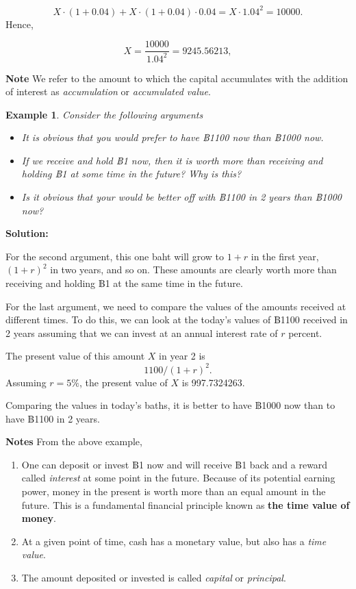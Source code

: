 \documentclass[
]{book}
\theoremstyle{definition}
\theoremstyle{definition}
\newtheorem{example}{Example}[chapter]
\theoremstyle{definition}
\theoremstyle{definition}
\theoremstyle{remark}
\begin{document}
\[X\cdot (1 + 0.04) + X \cdot (1 + 0.04) \cdot 0.04 =   X  \cdot  1.04^2 = 10000.\]
Hence,

\[X = \frac{10000}{1.04^2} = 9245.56213,\]

\textbf{Note} We refer to the amount to which the capital accumulates with
the addition of interest as \emph{accumulation} or \emph{accumulated value}.

\begin{example}

\emph{Consider the following arguments}

\begin{itemize}
\item
  \emph{It is obvious that you would prefer to have ฿1100 now than ฿1000
  now.}
\item
  \emph{If we receive and hold ฿1 now, then it is worth more than receiving
  and holding ฿1 at some time in the future? Why is this?}
\item
  \emph{Is it obvious that your would be better off with ฿1100 in 2 years
  than ฿1000 now?}
\end{itemize}

\end{example}

\textbf{Solution:}

For the second argument, this one baht will grow to \(1 + r\) in the first
year, \((1 + r)^2\) in two years, and so on. These amounts are clearly
worth more than receiving and holding ฿1 at the same time in the future.

For the last argument, we need to compare the values of the amounts received at different times. To do this, we can look at the today's
values of ฿1100 received in 2 years assuming that we can invest at an
annual interest rate of \(r\) percent.

The present value of this amount \(X\) in year 2 is \[ 1100/(1 + r)^2.\] Assuming \(r = 5\%\), the present value of \(X\) is 997.7324263.

Comparing the values in today's baths, it is better to
have ฿1000 now than to have ฿1100 in 2 years.

\textbf{Notes} From the above example,

\begin{enumerate}
\def\labelenumi{\arabic{enumi}.}
\item
  One can deposit or invest ฿1 now and will receive ฿1 back and a
  reward called \emph{interest} at some point in the future. Because of its
  potential earning power, money in the present is worth more than an
  equal amount in the future. This is a fundamental financial
  principle known as \textbf{the time value of money}.
\item
  At a given point of time, cash has a monetary value, but also has a
  \emph{time value}.
\item
  The amount deposited or invested is called \emph{capital} or \emph{principal}.
\end{enumerate}
\end{document}
